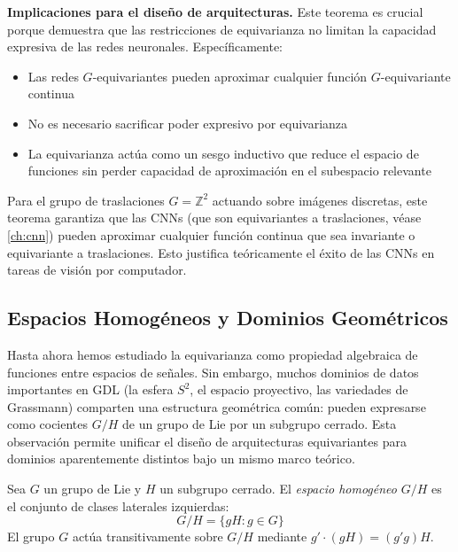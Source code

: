 \textbf{Implicaciones para el diseño de arquitecturas.} Este teorema es crucial porque demuestra que las restricciones de equivarianza no limitan la capacidad expresiva de las redes neuronales. Específicamente:

\begin{itemize}
    \item Las redes $G$-equivariantes pueden aproximar cualquier función $G$-equivariante continua
    \item No es necesario sacrificar poder expresivo por equivarianza
    \item La equivarianza actúa como un sesgo inductivo que reduce el espacio de funciones sin perder capacidad de aproximación en el subespacio relevante
\end{itemize}

\begin{example}
Para el grupo de traslaciones $G = \mathbb{Z}^2$ actuando sobre imágenes discretas, este teorema garantiza que las \glspl{CNN} (que son equivariantes a traslaciones, véase \autoref{ch:cnn}) pueden aproximar cualquier función continua que sea invariante o equivariante a traslaciones. Esto justifica teóricamente el éxito de las \glspl{CNN} en tareas de visión por computador.
\end{example}

\subsection{Espacios Homogéneos y Dominios Geométricos}\label{subsec:espacios_homogeneos}

Hasta ahora hemos estudiado la equivarianza como propiedad algebraica de funciones entre espacios de señales. Sin embargo, muchos dominios de datos importantes en \gls{GDL} (la esfera $S^2$, el espacio proyectivo, las variedades de Grassmann) comparten una estructura geométrica común: pueden expresarse como cocientes $G/H$ de un grupo de Lie por un subgrupo cerrado. Esta observación permite unificar el diseño de arquitecturas equivariantes para dominios aparentemente distintos bajo un mismo marco teórico.

\begin{definition}\label{def:espacio_homogeneo}
Sea $G$ un grupo de Lie y $H$ un subgrupo cerrado. El \textit{espacio homogéneo} $G/H$ es el conjunto de clases laterales izquierdas:
\begin{equation}
G/H = \{gH : g \in G\}
\end{equation}
El grupo $G$ actúa transitivamente sobre $G/H$ mediante $g' \cdot (gH) = (g'g)H$.
\end{definition}

